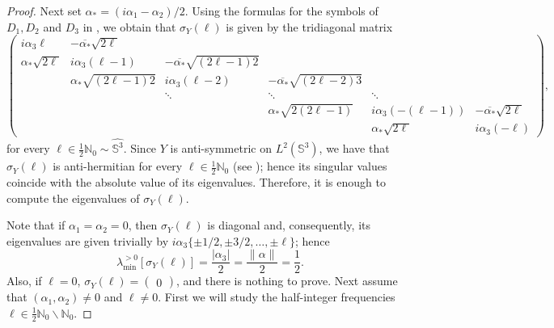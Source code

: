 \documentclass[11pt]{amsart}
\numberwithin{theorem}{section}
\numberwithin{equation}{section}
\theoremstyle{definition}
\numberwithin{example}{section}
\theoremstyle{definition}
\theoremstyle{definition}
\newcommand{\N}{\mathbb{N}}
\renewcommand{\S}{\mathbb{S}^3}
\begin{document}
\begin{proof}
 Next set $\alpha_*=(i\alpha_1-\alpha_2)/2$. Using the formulas for the symbols of $D_1,D_2$ and $D_3$ in \cite{RT2010_book}, we obtain that  $\sigma_Y(\ell)$ is given by the tridiagonal matrix
{\small\begin{equation*}
    \begin{pmatrix}
        i\alpha_3\ell & -\overline{\alpha_*}\sqrt{2\ell}&&&\\
        \alpha_*\sqrt{2\ell} &i\alpha_3(\ell-1)&-\overline{\alpha_*}\sqrt{(2\ell-1)2}&&\\
        &\alpha_*\sqrt{(2\ell-1)2}&i\alpha_3(\ell-2)&-\overline{\alpha_*}\sqrt{(2\ell-2)3} \\
        &&\ddots&\ddots&\ddots\\
        &&&\alpha_*\sqrt{2(2\ell-1)}&i\alpha_3(-(\ell-1))&-\overline{\alpha_*}\sqrt{2\ell}\\
        && &&\alpha_*\sqrt{2\ell}&i\alpha_3(-\ell)
    \end{pmatrix},
\end{equation*}}
for every $\ell\in\frac{1}{2}\N_0\sim \widehat{\mathbb{S}^3}$. Since $Y$ is anti-symmetric on $L^2(\S)$, we have that  $\sigma_Y(\ell)$ is anti-hermitian for every $\ell\in\frac{1}{2}\N_0$ (see \cite[Remark 10.4.20]{RT2010_book}); hence its singular values coincide with the absolute value of its eigenvalues. Therefore, it is enough to compute the eigenvalues of $\sigma_Y(\ell)$.

Note that if $\alpha_1=\alpha_2=0$, then $\sigma_Y(\ell)$ is diagonal and, consequently, its eigenvalues are given trivially by $i\alpha_3\{\pm 1/2,\pm 3/2,\dots,\pm\ell\}$; hence
\begin{equation*}
    \lambda_{\min}^{>0}[\sigma_Y(\ell)]=\frac{|\alpha_3|}{2}=\frac{\|\alpha\|}{2}=\frac{1}{2}.
\end{equation*}
Also, if $\ell=0$, $\sigma_Y(\ell)=\begin{pmatrix}
    0
\end{pmatrix}$,
and there is nothing to prove.
Next assume that $(\alpha_1,\alpha_2)\neq 0$ and $\ell\neq 0$.
First we will study the half-integer frequencies $\ell\in\frac{1}{2}\N_0\backslash\N_0$.


\end{proof}
\end{document}
